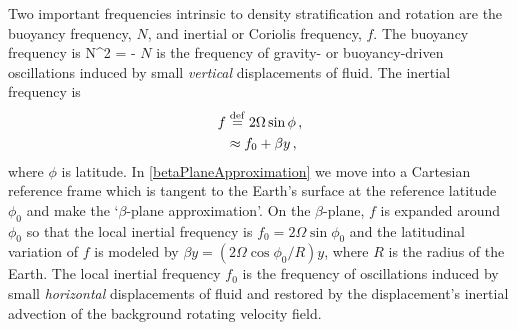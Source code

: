 \documentclass[12pt, oneside]{book}
\begin{document}
Two important frequencies intrinsic to density stratification and rotation are the buoyancy frequency, $N$, and inertial or Coriolis frequency, $f$.  The buoyancy frequency is
\beq
N^2  {}  = -   \per 
\eeq
$N$ is the frequency of gravity- or buoyancy-driven oscillations induced by small \textit{vertical} displacements of fluid.  The inertial frequency is 
\begin{align}
f &\stackrel{\mathrm{def}}{=} 2 \Omega \sin \phi \, , \\
&\approx f_0 + \beta y \, , \label{betaPlaneApproximation}
\end{align}
where $\phi$ is latitude.  In \eqref{betaPlaneApproximation} we move into a Cartesian reference frame which is tangent to the Earth's surface at the reference latitude $\phi_0$ and make the `$\beta$-plane approximation'.  On the $\beta$-plane, $f$ is expanded around $\phi_0$ so that the local inertial frequency is $f_0 = 2 \Omega \sin \phi_0$ and the latitudinal variation of $f$ is modeled by $\beta y = \left ( 2 \Omega \cos \phi_0 / R \right ) y$, where $R$ is the radius of the Earth.  The local inertial frequency $f_0$ is the frequency of oscillations induced by small \textit{horizontal} displacements of fluid and restored by the displacement's inertial advection of the background rotating velocity field.
\end{document}
